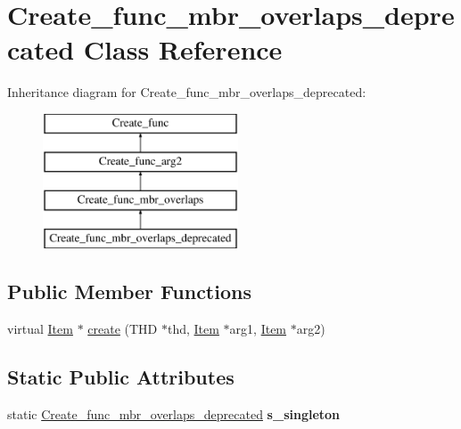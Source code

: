 \hypertarget{classCreate__func__mbr__overlaps__deprecated}{}\section{Create\+\_\+func\+\_\+mbr\+\_\+overlaps\+\_\+deprecated Class Reference}
\label{classCreate__func__mbr__overlaps__deprecated}
Inheritance diagram for Create\+\_\+func\+\_\+mbr\+\_\+overlaps\+\_\+deprecated\+:\begin{figure}[H]
\begin{center}
\leavevmode
\includegraphics[height=4.000000cm]{classCreate__func__mbr__overlaps__deprecated}
\end{center}
\end{figure}
\subsection*{Public Member Functions}
\begin{DoxyCompactItemize}
\item 
virtual \mbox{\hyperlink{classItem}{Item}} $\ast$ \mbox{\hyperlink{classCreate__func__mbr__overlaps__deprecated_a4df0c75a99a2d761d790dcc0ebce3ac0}{create}} (T\+HD $\ast$thd, \mbox{\hyperlink{classItem}{Item}} $\ast$arg1, \mbox{\hyperlink{classItem}{Item}} $\ast$arg2)
\end{DoxyCompactItemize}
\subsection*{Static Public Attributes}
\begin{DoxyCompactItemize}
\item 
\mbox{\label{classCreate__func__mbr__overlaps__deprecated_a318d75066a74ee8ad7b7b6c8869f7d0d}} 
static \mbox{\hyperlink{classCreate__func__mbr__overlaps__deprecated}{Create\+\_\+func\+\_\+mbr\+\_\+overlaps\+\_\+deprecated}} {\bfseries s\+\_\+singleton}
\end{DoxyCompactItemize}
